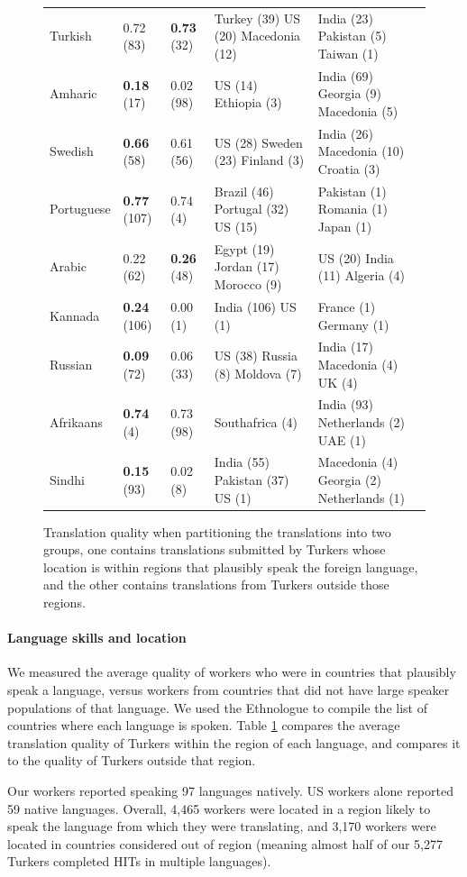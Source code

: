 \documentclass[11pt]{article}
\begin{document}
\begin{figure}
\begin{tabular}{lllll}
Turkish&0.72 (83) &\textbf{0.73} (32)&Turkey (39) US (20) Macedonia (12) &India (23) Pakistan (5) Taiwan (1) \\
Amharic&\textbf{0.18} (17)&0.02 (98)&US (14) Ethiopia (3) &India (69) Georgia (9) Macedonia (5) \\
Swedish&\textbf{0.66} (58)&0.61 (56)&US (28) Sweden (23) Finland (3) &India (26) Macedonia (10) Croatia (3) \\
Portuguese&\textbf{0.77} (107)&0.74 (4)&Brazil (46) Portugal (32) US (15) &Pakistan (1) Romania (1) Japan (1) \\
Arabic&0.22 (62) &\textbf{0.26} (48)&Egypt (19) Jordan (17) Morocco (9) &US (20) India (11) Algeria (4) \\
Kannada&\textbf{0.24} (106)&0.00 (1)&India (106) US (1) &France (1) Germany (1) \\
Russian&\textbf{0.09} (72)&0.06 (33)&US (38) Russia (8) Moldova (7) &India (17) Macedonia (4) UK (4) \\
Afrikaans&\textbf{0.74} (4)&0.73 (98)&Southafrica (4) &India (93) Netherlands (2) UAE (1) \\
Sindhi&\textbf{0.15} (93)&0.02 (8)&India (55) Pakistan (37) US (1) &Macedonia (4) Georgia (2) Netherlands (1) \\
\hline\hline
\end{tabular}
\normalsize
\caption{Translation quality when partitioning the translations into two groups, one contains translations submitted by Turkers whose location is within regions that plausibly speak the foreign language, and the other contains translations from Turkers outside those regions.} \label{region-summary}
\end{figure}


\paragraph{Language skills and location}

We measured the average quality of workers who were in countries that plausibly speak a language, versus workers from countries that did not have large speaker populations of that language.  We used the Ethnologue \cite{ethnologue} to compile the list of countries where each language is spoken.  Table \ref{region-summary} compares the average translation quality of Turkers within the region of each language, and compares it to the quality of Turkers outside that region. 

Our workers reported speaking 97 languages natively. US workers alone reported 59 native languages. Overall, 4,465 workers were located in a region likely to speak the language from which they were translating, and 3,170 workers were located in countries considered out of region (meaning almost half of our 5,277 Turkers completed HITs in multiple languages). 
\end{document}
